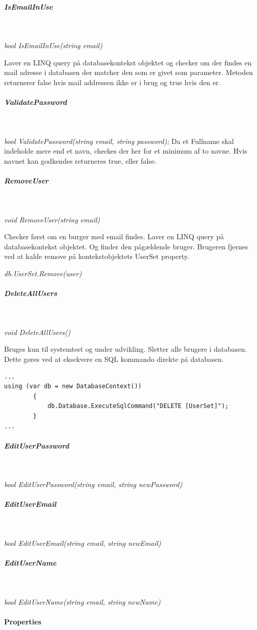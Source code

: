 \subparagraph{IsEmailInUse}\

\textit{bool IsEmailInUse(string email)}

Laver en LINQ query på databasekontekst objektet og checker om der findes en mail adresse i databasen der matcher den som er givet som parameter. Metoden returnerer false hvis mail addressen ikke er i brug og true hvis den er.

\subparagraph{ValidatePassword}\

\textit{bool ValidatePassword(string email, string password);}
Da et Fullname skal indeholde mere end et navn, checkes der her for et minimum af to navne. Hvis navnet kan godkendes returneres true, eller false.

\subparagraph{RemoveUser}\

\textit{void RemoveUser(string email)}

Checker først om en burger med email findes.
Laver en LINQ query på databasekontekst objektet. Og finder den pågældende bruger.
Brugeren fjernes ved at kalde remove på kontekstobjektets UserSet property.

\textit{db.UserSet.Remove(user)}

\subparagraph{DeleteAllUsers}\

\textit{void DeleteAllUsers()}

Bruges kun til systemtest og under udvikling.
Sletter alle brugere i databasen. Dette gøres ved at eksekvere en SQL kommando direkte på databasen. 

\begin{lstlisting}[caption=SQL injection på databasen ved sletning af brugere, label=sqlDeleteUsers]
...
using (var db = new DatabaseContext())
		{
			db.Database.ExecuteSqlCommand("DELETE [UserSet]");
		}
...	
\end{lstlisting}

\subparagraph{EditUserPassword}\

\textit{bool EditUserPassword(string email, string newPassword)}
\subparagraph{EditUserEmail}\

\textit{bool EditUserEmail(string email, string newEmail)}
\subparagraph{EditUserName}\

\textit{bool EditUserName(string email, string newName)}

\paragraph{Properties}\


